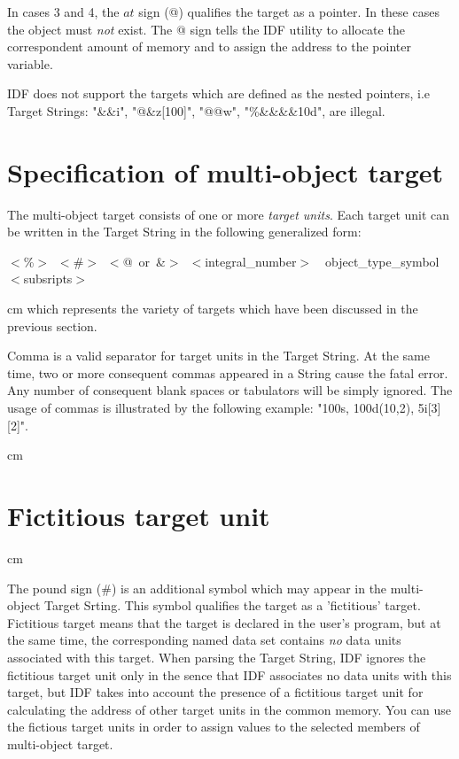In cases 3 and 4, the $at$ sign (@) qualifies the target
as a pointer.
In these cases the object must {\it not} exist.
The @ sign tells the IDF utility to allocate 
the correspondent amount of memory
and to assign the address to the pointer variable.

IDF does not support the targets which are defined as the nested pointers,
i.e Target Strings: "\&\&i", "@\&z[100]", "@@w", "\%\&\&\&\&10d",
are illegal.
 
\section{Specification of multi-object target}

The multi-object target consists of one or more
{\it target units}. Each target unit can be written
in the Target String in the following generalized form: 

\centerline{
$<$\%$>$\ $<$\#$>$\ $<$@\ or\ \&$>$\ $<$integral\_number$>$\ \ 
object\_type\_symbol\ \ $<$subsripts$>$
}

{
{ cm}
which represents the variety of targets which have been discussed
in the previous section.
}

Comma is a valid separator for target units in the Target String.
At the same time, two or more consequent commas appeared
in a String cause the fatal error.
Any number of consequent blank spaces or tabulators
will be simply ignored.
The usage of commas is illustrated by the following example:
"100s,  100d(10,2), 5i[3][2]".


 cm
\section*{Fictitious target unit}
 cm

The pound sign (\#) is an additional symbol which may appear
in the multi-object Target Srting. 
This symbol qualifies the target as a 'fictitious' target. 
Fictitious target means that the target is declared in the user's
program, but at the same time, the corresponding named data set
contains {\it no} data units associated with this target.
When parsing the Target String, IDF ignores the fictitious target unit  
only in the sence that IDF associates no data units with this target,
but IDF takes into account the presence of a fictitious target unit 
for calculating the address of other target units in the common memory.
You can use the fictious target units in order to assign values to the selected
members of multi-object target.

